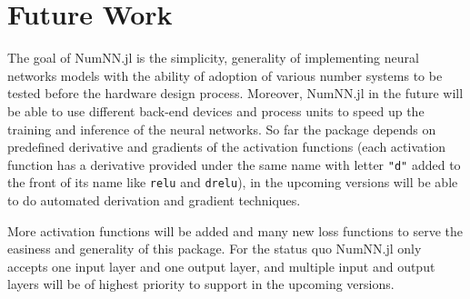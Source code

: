 \section{Future Work}

The goal of NumNN.jl is the simplicity, generality of implementing neural networks models with the ability of adoption of various number systems to be tested before the hardware design process. Moreover, NumNN.jl in the future will be able to use different back-end devices and process units to speed up the training and inference of the neural networks. So far the package depends on predefined derivative and gradients of the activation functions (each activation function has a derivative provided under the same name with letter \texttt{"d"} added to the front of its name like \texttt{relu} and \texttt{drelu}), in the upcoming versions will be able to do automated derivation and gradient techniques.

More activation functions will be added and many new loss functions to serve the easiness and generality of this package. For  the status quo NumNN.jl only accepts one input layer and one output layer, and multiple input and output layers will be of highest priority to support in the upcoming versions.